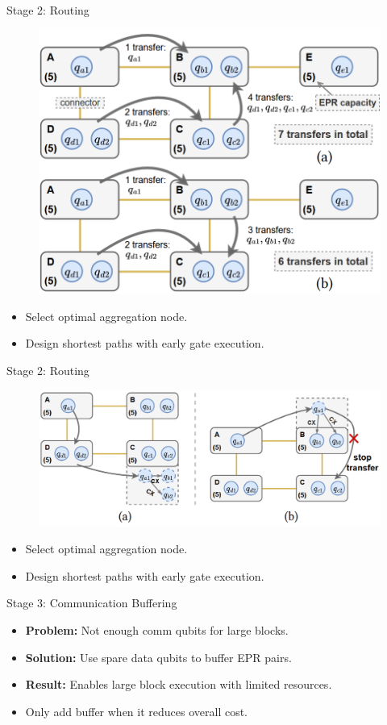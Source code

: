 \documentclass{beamer}
\begin{document}
	\begin{frame}{Stage 2: Routing}
		\begin{figure}
			\includegraphics[height=25ex]{figure/step2-1.png}
		\end{figure}
		\begin{itemize}
			\item Select optimal aggregation node.
			\item Design shortest paths with early gate execution.
		\end{itemize}
	\end{frame}
	
	\begin{frame}{Stage 2: Routing}
		\begin{figure}
			\includegraphics[height=20ex]{figure/step2-2.png}
		\end{figure}
		\begin{itemize}
			\item Select optimal aggregation node.
			\item Design shortest paths with early gate execution.
		\end{itemize}
	\end{frame}
	
	\begin{frame}{Stage 3: Communication Buffering}
		\begin{itemize}
			\item \textbf{Problem:} Not enough comm qubits for large blocks.
			\item \textbf{Solution:} Use spare data qubits to buffer EPR pairs.
			\item \textbf{Result:} Enables large block execution with limited resources.
			\item Only add buffer when it reduces overall cost.
		\end{itemize}
	\end{frame}
	
\end{document}
